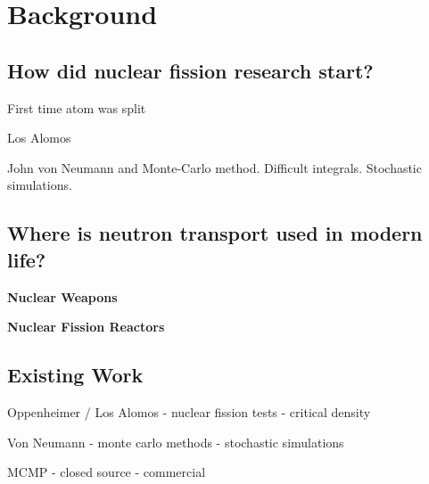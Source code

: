 

\section{Background}

\subsection{How did nuclear fission research start?}

First time atom was split 

Los Alomos

John von Neumann and Monte-Carlo method. Difficult integrals. Stochastic simulations.

\subsection{Where is neutron transport used in modern life?}

\textbf{Nuclear Weapons}

\textbf{Nuclear Fission Reactors}

\subsection{Existing Work}

Oppenheimer / Los Alomos
- nuclear fission tests
- critical density

Von Neumann
- monte carlo methods
- stochastic simulations

MCMP
- closed source
- commercial